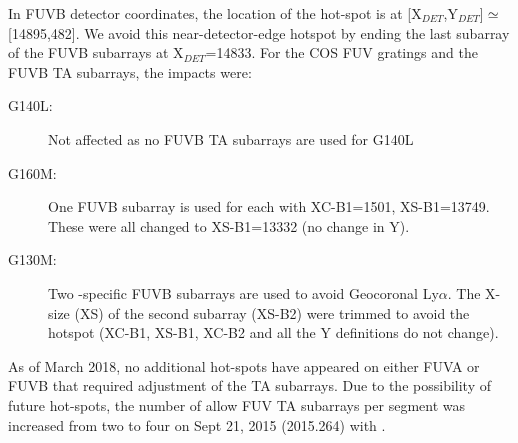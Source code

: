 In FUVB detector coordinates, the location of the hot-spot is at [X$_{DET}$,Y$_{DET}$]$\simeq$[14895,482].
We avoid this near-detector-edge hotspot by ending the last subarray of the FUVB subarrays at X$_{DET}$=14833.
For the COS FUV gratings and the FUVB TA subarrays, the impacts were:
\begin{description}
	\item[G140L:] Not affected as no FUVB TA subarrays are used for G140L
	\item[G160M:] One FUVB subarray is used for each \cenwave{} with XC-B1=1501, XS-B1=13749. These were all changed to XS-B1=13332 (no change in Y).
	\item[G130M:] Two \cenwave{}-specific FUVB subarrays are used to avoid Geocoronal Ly$\alpha$. The X-size (XS) of the second subarray (XS-B2) were trimmed to avoid the hotspot (XC-B1, XS-B1, XC-B2 and all the Y definitions do not change).
\end{description}
As of March 2018, no additional hot-spots have appeared on either FUVA or FUVB that required adjustment of the TA subarrays.
Due to the possibility of future hot-spots, the number of allow FUV TA subarrays per segment was increased from two to four on  Sept 21, 2015 (2015.264) with .
